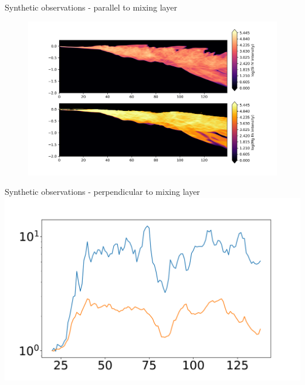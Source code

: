 \documentclass[10pt,aspectratio=169,usenames,dvipsnames]{beamer}
\begin{document}
\begin{frame}{Synthetic observations - parallel to mixing layer}
\begin{figure}
\includegraphics[width=0.95\linewidth]{2023Dundee/Figures/KHIrl2D_dt_thinintens.png}
\end{figure}
\end{frame}

\begin{frame}{Synthetic observations - perpendicular to mixing layer}
\includegraphics[width=0.95\linewidth]{2023Dundee/Figures/KHIrl2D_thinintens_mir.png}
\end{frame}
\end{document}
